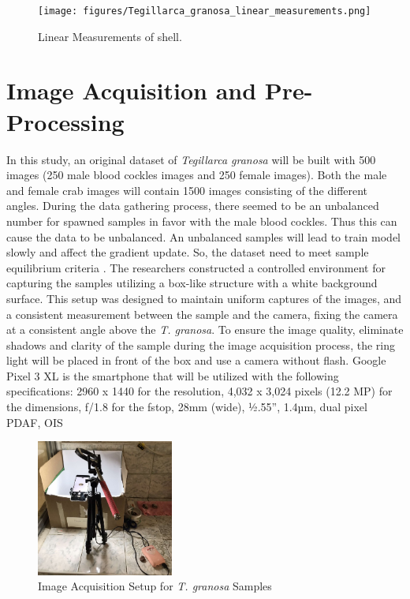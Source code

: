 \begin{figure}[!htbp]
	\centering
	\texttt{[image: figures/Tegillarca\_granosa\_linear\_measurements.png]}
	\caption{Linear Measurements of  \Tegillarcagranosa shell.}
	\label{fig:linear_measurements}
\end{figure}

\section{Image Acquisition and Pre-Processing}
\label{sec:imageprocess}
In this study, an original dataset of \textit{Tegillarca granosa} will be built with 500 images (250 male blood cockles images and 250 female images). Both the male and female crab images will contain 1500 images consisting of the different angles. During the data gathering process, there seemed to be an unbalanced number for spawned samples in favor with the male blood cockles. Thus this can cause the data to be unbalanced. An unbalanced samples will lead to train model slowly and affect the gradient update. So, the dataset need to meet sample equilibrium criteria \cite{cui2020}. The researchers constructed a controlled environment for capturing the samples utilizing a box-like structure with a white background surface. This setup was designed to maintain uniform captures of the images, and a consistent measurement between the sample and the camera, fixing the camera at a consistent angle above the \textit{T. granosa}. To ensure the image quality, eliminate shadows and clarity of the sample during the image acquisition process, the ring light will be placed in front of the box and use a camera without flash. Google Pixel 3 XL is the smartphone that will be utilized with the following specifications: 2960 x 1440 for the resolution, 4,032 x 3,024 pixels (12.2 MP) for the dimensions, f/1.8 for the fstop, 28mm (wide), ½.55”, 1.4µm, dual pixel PDAF, OIS \cite{concepcion2023}

\begin{figure}[!htbp]
	\centering
	\includegraphics[width=0.4\textwidth]{figures/setup.jpg}
	\caption{Image Acquisition Setup for \textit{T. granosa} Samples}
	\label{fig: setup}
\end{figure}



